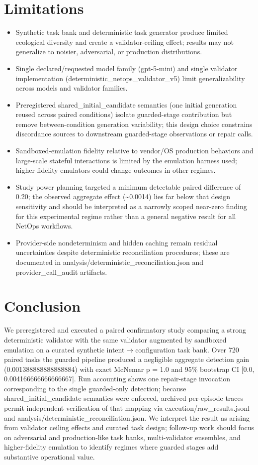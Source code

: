 \documentclass[conference]{IEEEtran}
\begin{document}
\section{Limitations}
\begin{itemize}
\item Synthetic task bank and deterministic task generator produce limited ecological diversity and create a validator-ceiling effect; results may not generalize to noisier, adversarial, or production distributions.
\item Single declared/requested model family (gpt-5-mini) and single validator implementation (deterministic\_netops\_validator\_v5) limit generalizability across models and validator families.
\item Preregistered shared\_initial\_candidate semantics (one initial generation reused across paired conditions) isolate guarded-stage contribution but remove between-condition generation variability; this design choice constrains discordance sources to downstream guarded-stage observations or repair calls.
\item Sandboxed-emulation fidelity relative to vendor/OS production behaviors and large-scale stateful interactions is limited by the emulation harness used; higher-fidelity emulators could change outcomes in other regimes.
\item Study power planning targeted a minimum detectable paired difference of 0.20; the observed aggregate effect (\textasciitilde{}0.0014) lies far below that design sensitivity and should be interpreted as a narrowly scoped near-zero finding for this experimental regime rather than a general negative result for all NetOps workflows.
\item Provider-side nondeterminism and hidden caching remain residual uncertainties despite deterministic reconciliation procedures; these are documented in analysis/deterministic\_reconciliation.json and provider\_call\_audit artifacts.
\end{itemize}

\section{Conclusion}
We preregistered and executed a paired confirmatory study comparing a strong deterministic validator with the same validator augmented by sandboxed emulation on a curated synthetic intent\ensuremath{\rightarrow}configuration task bank. Over 720 paired tasks the guarded pipeline produced a negligible aggregate detection gain (0.001388888888888884) with exact McNemar p = 1.0 and 95\% bootstrap CI [0.0, 0.004166666666666667]. Run accounting shows one repair-stage invocation corresponding to the single guarded-only detection; because shared\_initial\_candidate semantics were enforced, archived per-episode traces permit independent verification of that mapping via execution/raw\_results.jsonl and analysis/deterministic\_reconciliation.json. We interpret the result as arising from validator ceiling effects and curated task design; follow-up work should focus on adversarial and production-like task banks, multi-validator ensembles, and higher-fidelity emulation to identify regimes where guarded stages add substantive operational value.
\end{document}

